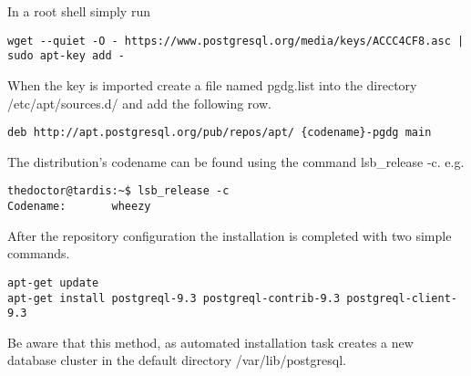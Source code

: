 In a root shell simply run
\begin{verbatim}
wget --quiet -O - https://www.postgresql.org/media/keys/ACCC4CF8.asc | sudo apt-key add -
\end{verbatim}
When the key is imported create a file named pgdg.list into the directory /etc/apt/sources.d/ and
add the following row.

\begin{verbatim}
deb http://apt.postgresql.org/pub/repos/apt/ {codename}-pgdg main
\end{verbatim}


The distribution's codename can be found using the command lsb\_release -c. 
e.g.
\begin{verbatim}
thedoctor@tardis:~$ lsb_release -c
Codename:       wheezy
\end{verbatim}

After the repository configuration the installation is completed with two simple commands.

\begin{verbatim}
apt-get update
apt-get install postgreql-9.3 postgreql-contrib-9.3 postgreql-client-9.3 
\end{verbatim}

Be aware that this method, as automated installation task creates a new database cluster in
the default directory /var/lib/postgresql.


